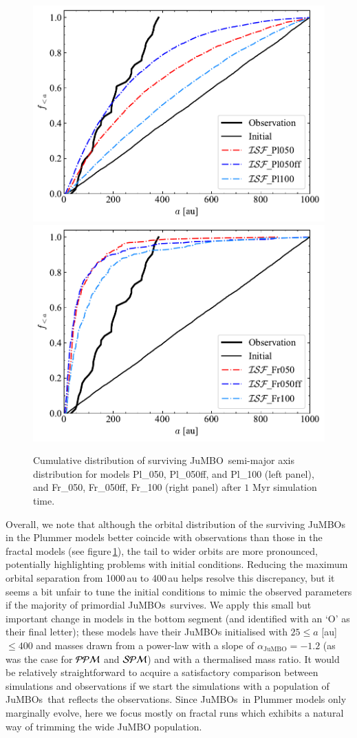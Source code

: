 \documentclass[submission,phys]{lib/SciPost}
\newcommand{\jumbo}{\mbox{JuMBO}}
\newcommand{\jumbos}{\mbox{JuMBOs}}
\begin{document}
\begin{figure}
    \centering
    \includegraphics[width=0.49\columnwidth]{figures/Plummer_General_sem_axis.pdf}
    \includegraphics[width=0.49\columnwidth]{figures/Fractal_General_sem_axis.pdf}
    \caption{Cumulative distribution of surviving \jumbo\, semi-major
      axis distribution for models Pl\_050, Pl\_050ff, and Pl\_100
      (left panel), and Fr\_050, Fr\_050ff, Fr\_100 (right panel) after $1$ Myr simulation time.}
    \label{Fig:Gen_Semi_Plummer}
    \label{Fig:Gen_Semi_Fractal}
\end{figure}

Overall, we note that although the orbital distribution of the
surviving \jumbos\, in the Plummer models better coincide with
observations than those in the fractal models (see
figure\,\ref{Fig:Gen_Semi_Fractal}), the tail to wider orbits are more
pronounced, potentially highlighting problems with initial conditions.
Reducing the maximum orbital separation from 1000\,au to 400\,au helps
resolve this discrepancy, but it seems a bit unfair to tune the
initial conditions to mimic the observed parameters if the majority of
primordial \jumbos\ survives.  We apply this small but important
change in models in the bottom segment (and identified with an `O' as
their final letter); these models have their JuMBOs initialised with
$25\leq a$ [au]$\leq 400$ and masses drawn from a power-law with a
slope of $\alpha_{\jumbo} =-1.2$ (as was the case for ${\cal PPM}$ and
${\cal SPM}$) and with a thermalised mass ratio.  It would be
relatively straightforward to acquire a satisfactory comparison
between simulations and observations if we start the simulations with
a population of \jumbos\, that reflects the observations.
Since \jumbos\, in Plummer models only marginally evolve, here we
focus mostly on fractal runs which exhibits a natural way of trimming
the wide JuMBO population.
      
\end{document}
